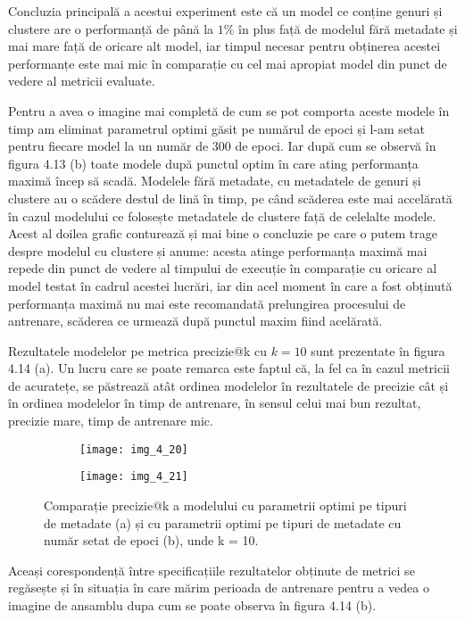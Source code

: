 Concluzia principală a acestui experiment este că un model ce conține genuri și clustere are o performanță de până la $1\%$ în plus față de modelul fără metadate și mai mare față de oricare alt model, iar timpul necesar pentru obținerea acestei performanțe este mai mic în comparație cu cel mai apropiat model din punct de vedere al metricii evaluate.

Pentru a avea o imagine mai completă de cum se pot comporta aceste modele în timp am eliminat parametrul optimi găsit pe numărul de epoci și l-am setat pentru fiecare model la un număr de 300 de epoci. Iar după cum se observă în figura 4.13 (b) toate modele după punctul optim în care ating performanța maximă încep să scadă. Modelele fără metadate, cu metadatele de genuri și clustere au o scădere destul de lină în timp, pe când scăderea este mai accelărată în cazul modelului ce folosește metadatele de clustere față de celelalte modele.
Acest al doilea grafic conturează și mai bine o concluzie pe care o putem trage despre modelul cu clustere și anume: acesta atinge performanța maximă mai repede din punct de vedere al timpului de execuție în comparație cu oricare al model testat în cadrul acestei lucrări, iar din acel moment în care a fost obținută performanța maximă nu mai este recomandată prelungirea procesului de antrenare, scăderea ce urmează după punctul maxim fiind acelărată.

\vspace{5mm}
Rezultatele modelelor pe metrica precizie@k cu $k=10$ sunt prezentate în figura 4.14 (a). Un lucru care se poate remarca este faptul că, la fel ca în cazul metricii de acuratețe, se păstrează atât ordinea modelelor în rezultatele de precizie cât și în ordinea modelelor în timp de antrenare, în sensul celui mai bun rezultat, precizie mare, timp de antrenare mic.
\begin{figure}[!h]
  \begin{subfigure}[b]{0.5\textwidth}
    \texttt{[image: img\_4\_20]}
    \caption{}
    \label{fig:f1}
  \end{subfigure}
  \hfill
  \begin{subfigure}[b]{0.5\textwidth}
    \texttt{[image: img\_4\_21]}
    \caption{}
    \label{fig:f2}
  \end{subfigure}
  \caption[Comparație precizie@k a modelului cu parametrii optimi pe tipuri de metadate]{Comparație precizie@k a modelului cu parametrii optimi pe tipuri de metadate (a) și cu parametrii optimi pe tipuri de metadate cu număr setat de epoci (b), unde k = 10.}
\end{figure}
Aceași corespondență între specificațiile rezultatelor obținute de metrici se regăsește și în situația în care mărim perioada de antrenare pentru a vedea o imagine de ansamblu dupa cum se poate observa în figura 4.14 (b).

